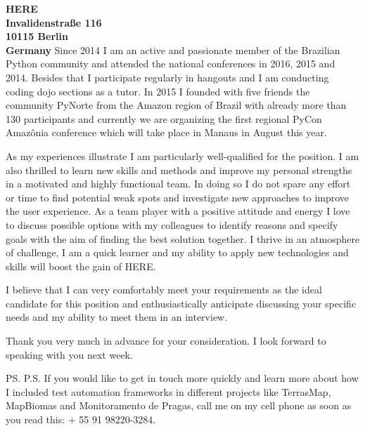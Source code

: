 \documentclass[a4paper]{joaosoares-letter}
\begin{document}
\begin{letter}{\bfseries HERE\\Invalidenstraße 116\\10115 Berlin\\Germany}
Since 2014 I am an active and passionate member of the Brazilian Python community and attended the national conferences in 2016, 2015 and 2014. Besides that I participate regularly in hangouts and I am conducting coding dojo sections as a tutor. In 2015 I founded with five friends the community PyNorte  from the Amazon region of Brazil with already more than 130 participants and currently we are organizing the first regional PyCon Amazônia conference which will take place in Manaus in August this year.

As my experiences illustrate I am particularly well-qualified for the position. I am also thrilled to learn new skills and methods and improve my personal strengths in a motivated and highly functional team. In doing so I do not spare any effort or time to find potential weak spots and investigate new approaches to improve the user experience. As a team player with a positive attitude and energy I love to discuss possible options with my colleagues to identify reasons and specify goals with the aim of finding the best solution together. I thrive in an atmosphere of challenge, I am a quick learner and my ability to apply new technologies and skills will boost the gain of HERE.

I believe that I can very comfortably meet your requirements as the ideal candidate for this position and enthusiastically anticipate discussing your specific needs and my ability to meet them in an interview.


\closing{Thank you very much in advance for your consideration. I look forward to speaking with you next week.}
\vspace{10pt}
\ps
P.S. If you would like to get in touch more quickly and learn more about how I included test automation frameworks in different projects like TerrasMap, MapBiomas and Monitoramento de Pragas, call me on my cell phone as soon as you read this: + 55 91 98220-3284.
\vspace{\fill}

\end{letter}
\end{document}
